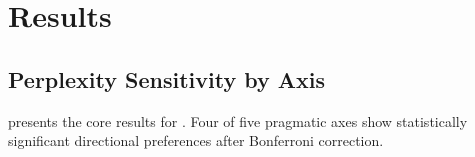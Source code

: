 \section{Results}
\label{sec:results}

\subsection{Perplexity Sensitivity by Axis}
\label{sec:main_results}

 presents the core results for \qwenseven. Four of five pragmatic axes show statistically significant directional preferences after Bonferroni correction.

\begin{table}[t]
    \centering
    \caption{Perplexity sensitivity results for \qwenseven across 30 scenarios. $\dloglik$: mean signed log-likelihood difference (positive = prefers Pole~B). Consistency: $|2f{-}1|$ where $f$ is the fraction preferring the majority pole. All $p$-values are Bonferroni-corrected ($\alpha{=}0.0083$). Best (largest) effect sizes among pragmatic axes in \textbf{bold}.}
    \label{tab:main_results}
\end{table}

